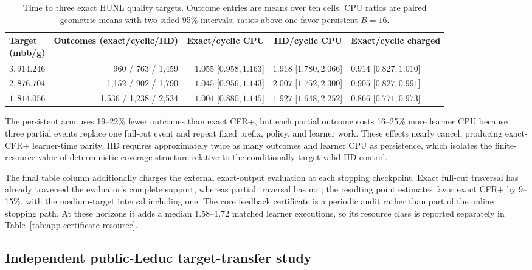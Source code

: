 \begin{table}[h]
\caption{Time to three exact HUNL quality targets.  Outcome entries are means
over ten cells.  CPU ratios are paired geometric means with two-sided 95\%
intervals; ratios above one favor persistent $B=16$.}
\label{tab:app-target-valid-time}
\centering\footnotesize
\setlength{\tabcolsep}{2.8pt}
\begin{tabular}{@{}lrrrl@{}}
\toprule
\shortstack{Target\\(mbb/g)} & Outcomes (exact/cyclic/IID) & Exact/cyclic CPU & IID/cyclic CPU &
Exact/cyclic charged \\
\midrule
$3,914.246$ & 960 / 763 / 1,459
& $1.055$ [$0.958,1.163$] & $1.918$ [$1.780,2.066$]
& $0.914$ [$0.827,1.010$] \\
$2,876.704$ & 1,152 / 902 / 1,790
& $1.045$ [$0.956,1.143$] & $2.007$ [$1.752,2.300$]
& $0.905$ [$0.827,0.991$] \\
$1,814.056$ & 1,536 / 1,238 / 2,534
& $1.004$ [$0.880,1.145$] & $1.927$ [$1.648,2.252$]
& $0.866$ [$0.771,0.973$] \\
\bottomrule
\end{tabular}
\end{table}

The persistent arm uses 19--22\% fewer outcomes than exact CFR+, but each
partial outcome costs 16--25\% more learner CPU because three partial events
replace one full-cut event and repeat fixed prefix, policy, and learner work.
These effects nearly cancel, producing exact-CFR+ learner-time parity.  IID
requires approximately twice as many outcomes and learner CPU as persistence,
which isolates the finite-resource value of deterministic coverage structure
relative to the conditionally target-valid IID control.

The final table column additionally charges the external exact-output
evaluation at each stopping checkpoint.  Exact full-cut traversal has already
traversed the evaluator's complete support, whereas partial traversal has not;
the resulting point estimates favor exact CFR+ by 9--15\%, with the
medium-target interval including one.  The core feedback
certificate is a periodic audit rather than part of the online stopping path.
At these horizons it adds a median 1.58--1.72 matched learner executions, so
its resource class is reported separately in
Table~\ref{tab:app-certificate-resource}.

\subsection{Independent public-Leduc target-transfer study}
\label{app:leduc-transfer}

